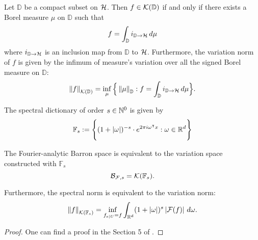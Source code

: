 \begin{lemma}
    \label{lemma:compact_set_integral_representation}
    Let $\mathbb{D}$ be a compact subset on $\mathcal{H}$. Then $f \in
    \mathcal{K}({\mathbb{D}})$ if and only if there exists a Borel measure $\mu$ on
    $\mathbb{D}$ such that
    \begin{equation}
        f = \int_{\mathbb{D}} i_{{\mathbb{D}}\to{\mathcal{H}}} \,d\mu
    \end{equation}
    where $i_{{\mathbb{D}}\to{\mathcal{H}}}$ is an inclusion map from
    $\mathbb{D}$ to $\mathcal{H}$. Furthermore, the variation norm of $f$ is given
    by the infimum of measure's variation over all the signed Borel measure on
    $\mathbb{D}$:
    \begin{equation}
        \left\| {f} \right\|_{\mathcal{K}({\mathbb{D}})} = \inf_{\mu}\Big\{
            \left\| \mu \right\|_{\mathbb{D}}: 
            f = \int_{\mathbb{D}} i_{{\mathbb{D}}\to{\mathcal{H}}} \,d\mu
        \Big\}.
    \end{equation}
\end{lemma}

\begin{definition}
    The spectral dictionary of order $s \in \mathbb{N}^0$ is given by
    \begin{equation}
        \mathbb{F}_s := \Bigg\{ 
            (1 + \left| \omega \right|)^{-s} \cdot e^{2\pi i\omega{}^{\intercal} x}: 
            \omega \in \mathbb{R}^d
        \Bigg\}
    \end{equation}
\end{definition}

\begin{theorem}
The Fourier-analytic Barron space is equivalent to the variation space
constructed with $\mathbb{F}_s$
\begin{equation}
    \mathcal{B}_{\mathcal{F}, s} = \mathcal{K}({\mathbb{F}_s}).
\end{equation}

Furthermore, the spectral norm is equivalent to the variation norm:
\begin{equation}
    \left\| {f} \right\|_{\mathcal{K}({\mathbb{F}_s})} =
    \inf_{f_{e\mid U} = f} \int_{\mathbb{R}^d} 
    (1+\left| \omega \right|)^s \left| \mathcal{F}(f) \right| \,d\omega.
\end{equation}
\end{theorem}

\begin{proof}
    One can find a proof in the Section 5 of
    \cite{siegelCharacterizationVariationSpaces2022}.
\end{proof}

